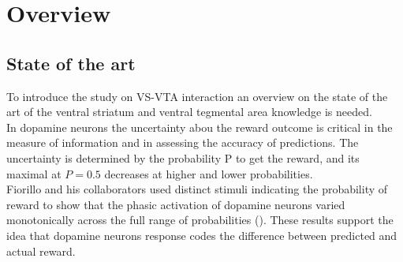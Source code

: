 \chapter{Overview}
\label{chap:Overview}
\section{State of the art}
\label{sec:StateArt}
To introduce the study on VS-VTA interaction an overview on the state of the art of the ventral striatum and ventral tegmental area knowledge is needed.\\
In dopamine neurons the uncertainty abou the reward outcome is critical in the measure of information and in assessing the
accuracy of predictions. The uncertainty is determined by the probability P to get the reward, and its maximal at $P=0.5$
decreases at higher and lower probabilities.\\Fiorillo and his collaborators used distinct stimuli indicating the probability of reward to show that the phasic activation of dopamine neurons varied monotonically across the full range of probabilities (\cite{Fiorillo}). These results support the idea that dopamine neurons response codes the difference between predicted and actual reward.\\
